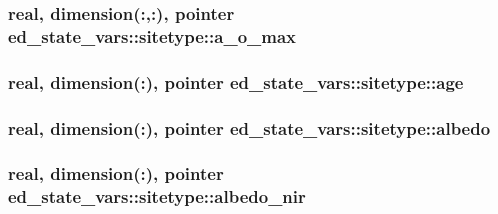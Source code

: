 \subsubsection[{\texorpdfstring{a\+\_\+o\+\_\+max}{a_o_max}}]{\setlength{\rightskip}{0pt plus 5cm}real, dimension(\+:,\+:), pointer ed\+\_\+state\+\_\+vars\+::sitetype\+::a\+\_\+o\+\_\+max}\hypertarget{structed__state__vars_1_1sitetype_a588cda3ef4f91be0671e4c457b8b5b0a}{}\label{structed__state__vars_1_1sitetype_a588cda3ef4f91be0671e4c457b8b5b0a}
\subsubsection[{\texorpdfstring{age}{age}}]{\setlength{\rightskip}{0pt plus 5cm}real, dimension(\+:), pointer ed\+\_\+state\+\_\+vars\+::sitetype\+::age}\hypertarget{structed__state__vars_1_1sitetype_a9fdfcfd47bf3e35de24d6d33577e3d7a}{}\label{structed__state__vars_1_1sitetype_a9fdfcfd47bf3e35de24d6d33577e3d7a}
\subsubsection[{\texorpdfstring{albedo}{albedo}}]{\setlength{\rightskip}{0pt plus 5cm}real, dimension(\+:), pointer ed\+\_\+state\+\_\+vars\+::sitetype\+::albedo}\hypertarget{structed__state__vars_1_1sitetype_a8027a912b702542bcff4bfe5809c57af}{}\label{structed__state__vars_1_1sitetype_a8027a912b702542bcff4bfe5809c57af}
\subsubsection[{\texorpdfstring{albedo\+\_\+nir}{albedo_nir}}]{\setlength{\rightskip}{0pt plus 5cm}real, dimension(\+:), pointer ed\+\_\+state\+\_\+vars\+::sitetype\+::albedo\+\_\+nir}\hypertarget{structed__state__vars_1_1sitetype_af7c0da4fd16bf8396ff39e40702b2a82}{}\label{structed__state__vars_1_1sitetype_af7c0da4fd16bf8396ff39e40702b2a82}
